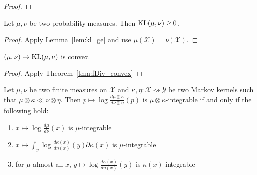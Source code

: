 \begin{proof}\leanok
{}
\end{proof}

\begin{lemma}
  \label{lem:kl_nonneg}
  \leanok
  Let $\mu, \nu$ be two probability measures. Then $\operatorname{KL}(\mu, \nu) \ge 0$.
\end{lemma}

\begin{proof}\leanok
{}
Apply Lemma~\ref{lem:kl_ge} and use $\mu(\mathcal X) = \nu (\mathcal X)$.
\end{proof}

\begin{lemma}
  \label{lem:kl_convex}
  $(\mu, \nu) \mapsto \operatorname{KL}(\mu, \nu)$ is convex.
\end{lemma}

\begin{proof}
Apply Theorem~\ref{thm:fDiv_convex}
\end{proof}

\begin{lemma}
  \label{lem:integrable_llr_compProd_iff}
  \leanok
  \uses{}
  Let $\mu, \nu$ be two finite measures on $\mathcal X$ and $\kappa, \eta : \mathcal X \rightsquigarrow \mathcal Y$ be two Markov kernels such that $\mu \otimes \kappa \ll \nu \otimes \eta$. Then $p \mapsto \log \frac{d \mu \otimes \kappa}{d \nu \otimes \eta}(p)$ is $\mu \otimes \kappa$-integrable if and only if the following hold:
  \begin{enumerate}
    \item $x \mapsto \log \frac{d \mu}{d \nu}(x)$ is $\mu$-integrable \label{:1}
    \item $x \mapsto \int_y  \log \frac{d \kappa(x)}{d \eta(x)}(y) \partial \kappa(x)$ is $\mu$-integrable \label{:2}
    \item for $\mu$-almost all $x$, $y \mapsto \log \frac{d \kappa(x)}{d \eta(x)}(y)$ is $\kappa(x)$-integrable \label{:3}
  \end{enumerate}
\end{lemma}

